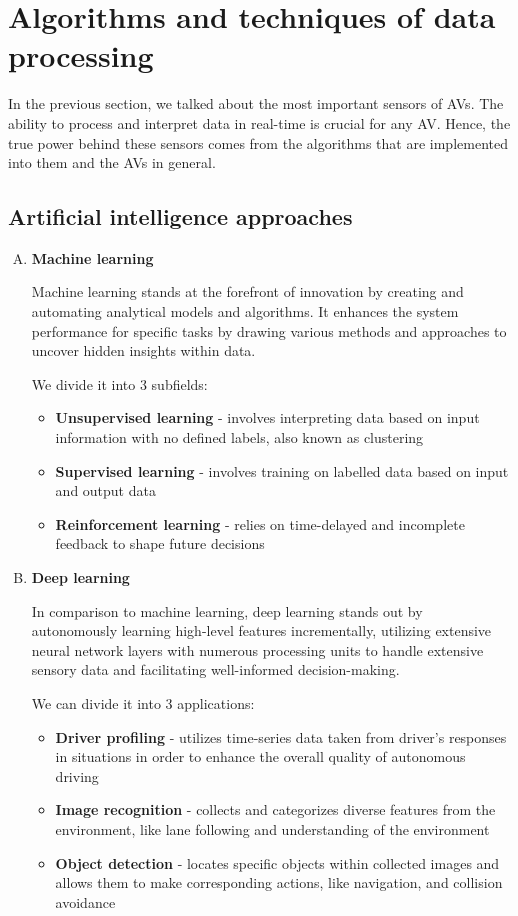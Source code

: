 \documentclass[10pt,oneside,english,a4paper]{article}
\begin{document}

\section{Algorithms and techniques of data processing} \label{algorithms}
In the previous section, we talked about the most important sensors of AVs. The ability to process and interpret data in real-time is crucial for any AV. Hence, the true power behind these sensors comes from the algorithms that are implemented into them and the AVs in general.  

\subsection{Artificial intelligence approaches}
\begin{enumerate}[A)]
    \item \textbf{Machine learning}
    \par Machine learning stands at the forefront of innovation by creating and automating analytical models and algorithms. It enhances the system performance for specific tasks by drawing various methods and approaches to uncover hidden insights within data.
    \par We divide it into 3 subfields:
    \begin{itemize}
        \item \textbf{Unsupervised learning} - involves interpreting data based on input information with no defined labels, also known as clustering
        \item \textbf{Supervised learning} - involves training on labelled data based on input and output data
        \item \textbf{Reinforcement learning} - relies on time-delayed and incomplete feedback to shape future decisions
    \end{itemize}
    
    \item \textbf{Deep learning}
    \par In comparison to machine learning, deep learning stands out by autonomously learning high-level features incrementally, utilizing extensive neural network layers with numerous processing units to handle extensive sensory data and facilitating well-informed decision-making.
    \par We can divide it into 3 applications:
    \begin{itemize}
        \item \textbf{Driver profiling} - utilizes time-series data taken from driver's responses in situations in order to enhance the overall quality of autonomous driving
        \item \textbf{Image recognition} - collects and categorizes diverse features from the environment, like lane following and understanding of the environment
        \item \textbf{Object detection} - locates specific objects within collected images and allows them to make corresponding actions, like navigation, and collision avoidance \cite{AIandIoT, Fundamentals, researchresults, Taskoffloading}
    \end{itemize}
\end{enumerate} 
\end{document}
